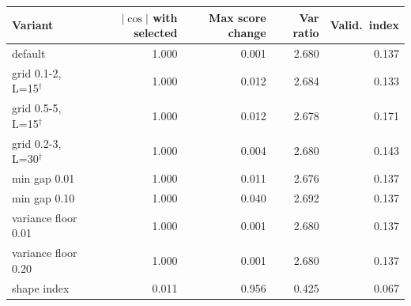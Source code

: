 \begin{tabular}{lrrrr}
\toprule
Variant & $|\cos|$ with selected & Max score change & Var ratio & Valid.\ index \\
\midrule
default & 1.000 & 0.001 & 2.680 & 0.137 \\
\addlinespace
grid 0.1-2, L=15$^\dagger$ & 1.000 & 0.012 & 2.684 & 0.133 \\
grid 0.5-5, L=15$^\dagger$ & 1.000 & 0.012 & 2.678 & 0.171 \\
grid 0.2-3, L=30$^\dagger$ & 1.000 & 0.004 & 2.680 & 0.143 \\
\addlinespace
min gap 0.01 & 1.000 & 0.011 & 2.676 & 0.137 \\
min gap 0.10 & 1.000 & 0.040 & 2.692 & 0.137 \\
variance floor 0.01 & 1.000 & 0.001 & 2.680 & 0.137 \\
variance floor 0.20 & 1.000 & 0.001 & 2.680 & 0.137 \\
shape index & 0.011 & 0.956 & 0.425 & 0.067 \\
\bottomrule
\end{tabular}
